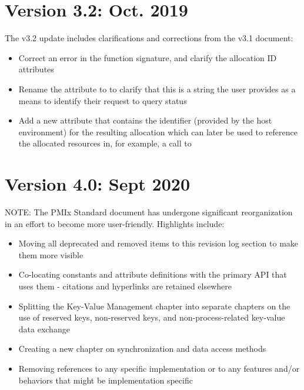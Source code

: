 \section{Version 3.2: Oct. 2019}

The v3.2 update includes clarifications and corrections from the v3.1 document:

\begin{itemize}
    \item Correct an error in the  function signature, and clarify the allocation ID attributes
    \item Rename the  attribute to  to clarify that this is a string the user provides as a means to identify their request to query status
    \item Add a new  attribute that contains the identifier (provided by the host environment) for the resulting allocation which can later be used to reference the allocated resources in, for example, a call to 
\end{itemize}

\section{Version 4.0: Sept 2020}


NOTE: The PMIx Standard document has undergone significant reorganization in an
effort to become more user-friendly. Highlights include:

\begin{itemize}
    \item Moving all deprecated and removed items to this revision log section
    to make them more visible
    \item Co-locating constants and attribute definitions with the primary
    API that uses them - citations and hyperlinks are retained elsewhere
    \item Splitting the Key-Value Management chapter into separate chapters on
    the use of reserved keys, non-reserved keys, and non-process-related
    key-value data exchange
    \item Creating a new chapter on synchronization and data access methods
    \item Removing references to any specific implementation or to any features
    and/or behaviors that might be implementation specific
\end{itemize}

